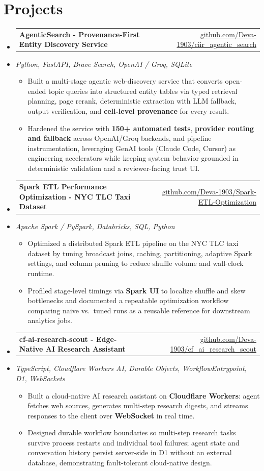 \documentclass[letterpaper,10pt]{article}
\makeatletter
\newcommand{\resumeItem}[1]{
  \item\small{#1\vspace{-1pt}}
}
\newcommand{\resumeProjectHeading}[2]{
    \item
    \begin{tabular*}{0.985\textwidth}[t]{l@{\extracolsep{\fill}}r}
      \small\textbf{#1} & \small #2 \\
    \end{tabular*}\vspace{-5pt}
}
\newcommand{\resumeProjectSubheading}[1]{
  \vspace{-2pt}\item[] {\small\textcolor{ResumeSlate}{\emph{#1}}}\vspace{-3pt}
}
\newcommand{\resumeSubHeadingListStart}{\begin{itemize}[leftmargin=0.0in, label={}, itemsep=2pt, topsep=2pt]}
\newcommand{\resumeSubHeadingListEnd}{\end{itemize}}
\newcommand{\resumeItemListStart}{\begin{itemize}[leftmargin=0.18in, itemsep=2pt, topsep=1pt]}
\newcommand{\resumeItemListEnd}{\end{itemize}\vspace{-4pt}}
\makeatother
\begin{document}
\section{Projects}
\resumeSubHeadingListStart
  \resumeProjectHeading
    {AgenticSearch - Provenance-First Entity Discovery Service}
    {\href{https://github.com/Deva-1903/ciir_agentic_search}{github.com/Deva-1903/ciir\_agentic\_search}}
  \resumeProjectSubheading{Python, FastAPI, Brave Search, OpenAI / Groq, SQLite}
    \resumeItemListStart
      \resumeItem{Built a multi-stage agentic web-discovery service that converts open-ended topic queries into structured entity tables via typed retrieval planning, page rerank, deterministic extraction with LLM fallback, output verification, and \textbf{cell-level provenance} for every result.}
      \resumeItem{Hardened the service with \textbf{150+ automated tests}, \textbf{provider routing and fallback} across OpenAI/Groq backends, and pipeline instrumentation, leveraging GenAI tools (Claude Code, Cursor) as engineering accelerators while keeping system behavior grounded in deterministic validation and a reviewer-facing trust UI.}
    \resumeItemListEnd
  \resumeProjectHeading
    {Spark ETL Performance Optimization - NYC TLC Taxi Dataset}
    {\href{https://github.com/Deva-1903/Spark-ETL-Optimization}{github.com/Deva-1903/Spark-ETL-Optimization}}
  \resumeProjectSubheading{Apache Spark / PySpark, Databricks, SQL, Python}
    \resumeItemListStart
      \resumeItem{Optimized a distributed Spark ETL pipeline on the NYC TLC taxi dataset by tuning broadcast joins, caching, partitioning, adaptive Spark settings, and column pruning to reduce shuffle volume and wall-clock runtime.}
      \resumeItem{Profiled stage-level timings via \textbf{Spark UI} to localize shuffle and skew bottlenecks and documented a repeatable optimization workflow comparing naive vs.\ tuned runs as a reusable reference for downstream analytics jobs.}
    \resumeItemListEnd
  \resumeProjectHeading
    {cf-ai-research-scout - Edge-Native AI Research Assistant}
    {\href{https://github.com/Deva-1903/cf_ai_research_scout}{github.com/Deva-1903/cf\_ai\_research\_scout}}
  \resumeProjectSubheading{TypeScript, Cloudflare Workers AI, Durable Objects, WorkflowEntrypoint, D1, WebSockets}
    \resumeItemListStart
      \resumeItem{Built a cloud-native AI research assistant on \textbf{Cloudflare Workers}: agent fetches web sources, generates multi-step research digests, and streams responses to the client over \textbf{WebSocket} in real time.}
      \resumeItem{Designed durable workflow boundaries so multi-step research tasks survive process restarts and individual tool failures; agent state and conversation history persist server-side in D1 without an external database, demonstrating fault-tolerant cloud-native design.}
    \resumeItemListEnd
\resumeSubHeadingListEnd
\vspace{-4pt}
\end{document}
